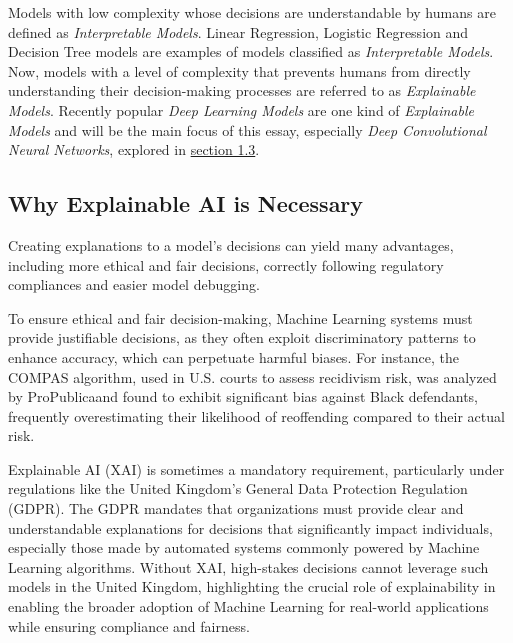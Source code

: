 Models with low complexity whose decisions are understandable by humans are defined as \emph{Interpretable Models}. Linear Regression, Logistic Regression and Decision Tree models are examples of models classified as \emph{Interpretable Models}. 
Now, models with a level of complexity that prevents humans from directly understanding their decision-making processes are referred to as \emph{Explainable Models}. 
Recently popular \emph{Deep Learning Models} are one kind of \emph{Explainable Models} and will be the main focus of this essay, especially \emph{Deep Convolutional Neural Networks}, explored in \hyperref[sec:convolutions]{section 1.3}.

\subsection{Why Explainable AI is Necessary}

Creating explanations to a model's decisions can yield many advantages, including  more ethical and fair decisions, correctly following regulatory compliances and easier model debugging.

To ensure ethical and fair decision-making, Machine Learning systems must provide justifiable decisions, as they often exploit discriminatory patterns to enhance accuracy, which can perpetuate harmful biases. 
For instance, the COMPAS algorithm, used in U.S. courts to assess recidivism risk, was analyzed by ProPublica\footnotemark and found to exhibit significant bias against Black defendants, frequently overestimating their likelihood of reoffending compared to their actual risk.

Explainable AI (XAI) is sometimes a mandatory requirement, particularly under regulations like the United Kingdom's General Data Protection Regulation (GDPR). 
The GDPR mandates that organizations must provide clear and understandable explanations for decisions that significantly impact individuals, especially those made by automated systems commonly powered by Machine Learning algorithms. 
Without XAI, high-stakes decisions cannot leverage such models in the United Kingdom, highlighting the crucial role of explainability in enabling the broader adoption of Machine Learning for real-world applications while ensuring compliance and fairness.

